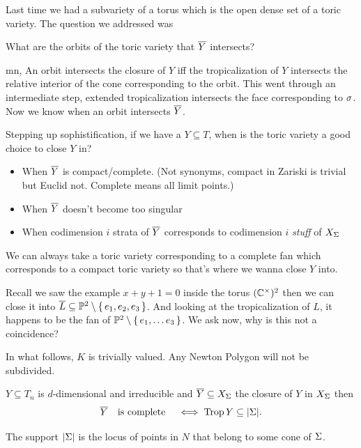 \documentclass[12pt]{memoir}
\DeclareMathOperator{\Trop}{Trop}
\begin{document}
Last time we had a subvariety of a torus which is the open dense set of a toric variety. The question we addressed was 
\begin{significant}
    What are the orbits of the toric variety that $\overline Y$ intersects?
\end{significant}mn,
An orbit intersects the closure of $Y$ iff the tropicalization of $Y$ intersects the relative interior of the cone corresponding to the orbit. This went through an intermediate step, extended tropicalization intersects the face corresponding to $\sigma$. Now we know when an orbit intersects $\overline Y$.\par 
Stepping up sophistification, if we have a $Y\subseteq T$, when is the toric variety a good choice to close $Y$ in? 
\begin{itemize}
    \item When $\overline Y$ is compact/complete. (Not synonyms, compact in Zariski is trivial but Euclid not. Complete means all limit points.)
    \item When $\overline Y$ doesn't become too singular
    \item When codimension $i$ strata of $\overline Y$ corresponds to codimension $i$ \emph{stuff} of $X_\Sigma$ 
\end{itemize}
We can always take a toric variety corresponding to a complete fan which corresponds to a compact toric variety so that's where we wanna close $Y$ into.\par
Recall we saw the example $x+y+1=0$ inside the torus $(\mathbb{C}^\times)^2$ then we can close it into $\overline L\subseteq \mathbb{P}^2\setminus\{\,e_1,e_2,e_3\,\}$. And looking at the tropicalization of $L$, it happens to be the fan of $\mathbb{P}^2\setminus\{\,e_1,\dots e_3\,\}$. We ask now, why is this not a coincidence?\par 
In what follows, $K$ is trivially valued. Any Newton Polygon will not be subdivided.

\begin{Th}
$Y\subseteq T_n$ is $d$-dimensional and irreducible and $\overline Y\subseteq X_\Sigma$ the closure of $Y$ in $X_\Sigma$ then 
$$\ov Y\word{is complete}\iff \Trop Y\subseteq |\Sg|.$$
\end{Th}

The support $|\Sigma|$ is the locus of points in $N$ that belong to some cone of $\Sigma$.
\end{document}
